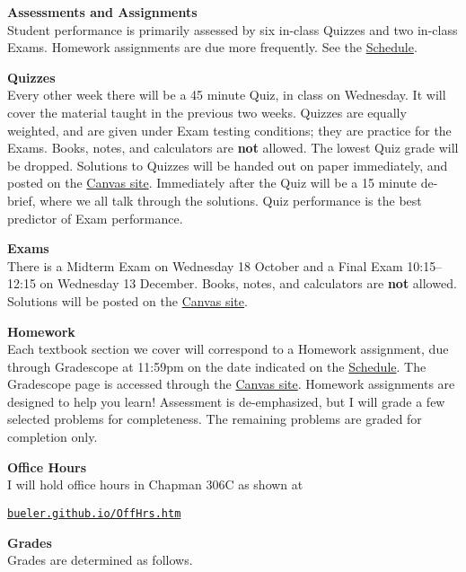 \documentclass[12pt]{article}
\renewcommand{\emph}[1]{\textsf{\textbf{#1}}}
\newcommand{\localhead}[1]{\par\smallskip\textbf{#1}\nobreak\\}%
\def\heading#1{\localhead{\large\emph{#1}}}
\def\subheading#1{\localhead{\emph{#1}}}
\begin{document}
\heading{Assessments and Assignments}
Student performance is primarily assessed by six in-class Quizzes and two in-class Exams.  Homework assignments are due more frequently.  See the \href{https://bueler.github.io/math302/assets/general/F23/schedule.pdf}{Schedule}.
 

\subheading{Quizzes}
Every other week there will be a 45 minute Quiz, in class on Wednesday.  It will cover the material taught in the previous two weeks.  Quizzes are equally weighted, and are given under Exam testing conditions; they are practice for the Exams.  Books, notes, and calculators are \emph{not} allowed.  The lowest Quiz grade will be dropped.  Solutions to Quizzes will be handed out on paper immediately, and posted on the \href{https://canvas.alaska.edu/courses/16214}{Canvas site}.  Immediately after the Quiz will be a 15 minute de-brief, where we all talk through the solutions.  Quiz performance is the best predictor of Exam performance.


\subheading{Exams}
There is a Midterm Exam on Wednesday 18 October and a Final Exam 10:15--12:15 on Wednesday 13 December.   Books, notes, and calculators are \emph{not} allowed.  Solutions will be posted on the \href{https://canvas.alaska.edu/courses/16214}{Canvas site}.


\subheading{Homework}
Each textbook section we cover will correspond to a Homework assignment, due through Gradescope at 11:59pm on the date indicated on the \href{https://bueler.github.io/math302/assets/general/F23/schedule.pdf}{Schedule}.  The Gradescope page is accessed through the \href{https://canvas.alaska.edu/courses/16214}{Canvas site}.  Homework assignments are designed to help you learn!  Assessment is de-emphasized, but I will grade a few selected problems for completeness.  The remaining problems are graded for completion only.  


\heading{Office Hours}
I will hold office hours in Chapman 306C as shown at

\smallskip
\centerline{\href{http://bueler.github.io/OffHrs.htm}{\tt bueler.github.io/OffHrs.htm}}


\clearpage\newpage
\heading{Grades}
Grades are determined as follows.
\end{document}
